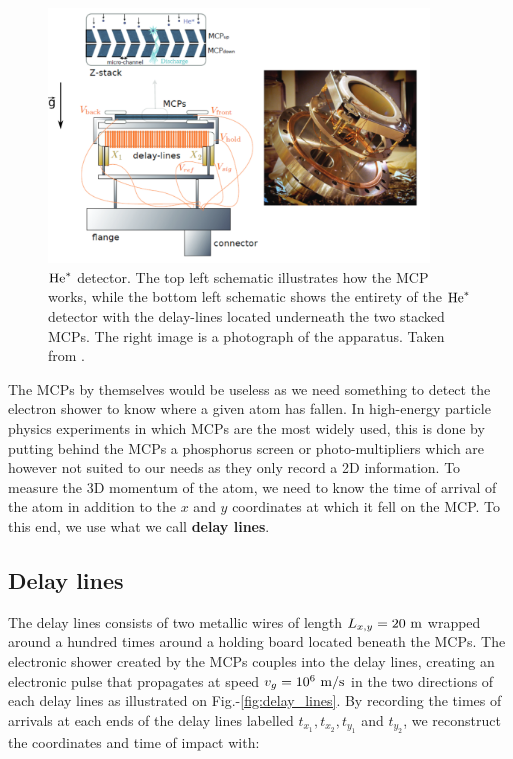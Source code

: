 \begin{figure}
    \centering
    \includegraphics[width=0.9\textwidth]{Fig/Chapter3/MCP.png}
    \caption{$\mathrm{He}^*$ detector. The top left schematic illustrates how the MCP works, while the bottom left schematic shows the entirety of the $\mathrm{He}^*$ detector with the delay-lines located underneath the two stacked MCPs. The right image is a photograph of the apparatus. Taken from \cite{cayla_these}.}
    \label{fig:MCP}
\end{figure}



The MCPs by themselves would be useless as we need something to detect the electron shower to know where a given atom has fallen. In high-energy particle physics experiments in which MCPs are the most widely used, this is done by putting behind the MCPs a phosphorus screen or photo-multipliers which are however not suited to our needs as they only record a 2D information. To measure the 3D momentum of the atom, we need to know the time of arrival of the atom in addition to the $x$ and $y$ coordinates at which it fell on the MCP. To this end, we use what we call \textbf{delay lines}.

\subsection{Delay lines}

\label{sec:delay_lines}

The delay lines consists of two metallic wires of length $L_{x,y}=20 \ \rm{m}$ wrapped around a hundred times around a holding board located beneath the MCPs. The electronic shower created by the MCPs couples into the delay lines, creating an electronic pulse that propagates at speed $v_g=10^6 \ \rm{m/s}$ in the two directions of each delay lines as illustrated on Fig.-\ref{fig:delay_lines}. By recording the times of arrivals at each ends of the delay lines labelled $t_{x_1},t_{x_2},t_{y_1}$ and $t_{y_2}$, we reconstruct the coordinates and time of impact with:


